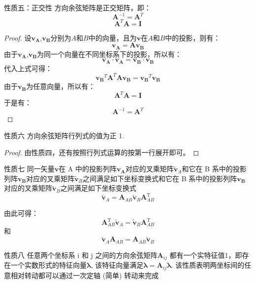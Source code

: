 \begin{myTheorem}{性质五：正交性}
    方向余弦矩阵是正交矩阵，即：
$$\boldsymbol{A}^{-1} = \boldsymbol{A}^{T}$$
        $$\boldsymbol{A}^{T}\boldsymbol{A}=\boldsymbol{I}$$

\end{myTheorem}
\begin{proof}
    设$\mathbf{v_A}$,$\mathbf{v_B}$分别为$A$和$B$中的向量，且为$\mathbf{v}$在$A$和$B$中的投影，则有：
$$\mathbf{v_A}=\boldsymbol{A}\mathbf{v_B}$$
    由于$\mathbf{v_A}$,$\mathbf{v_B}$为同一个向量在不同坐标系下的投影，所以有：
$$\mathbf{v_A}\cdot\mathbf{v_A}=\mathbf{v_B}\cdot\mathbf{v_B}$$
    代入上式可得：
$$\mathbf{v_B}^{T}\boldsymbol{A}^{T}\boldsymbol{A}\mathbf{v_B}=\mathbf{v_B}^{T}\mathbf{v_B}$$
    由于$\mathbf{v_B}$为任意向量，所以有：
$$\boldsymbol{A}^{T}\boldsymbol{A}=\boldsymbol{I}$$
    于是有：
$$\boldsymbol{A}^{-1} = \boldsymbol{A}^{T}$$
\end{proof}

\begin{myTheorem}{性质六}
    方向余弦矩阵行列式的值为正 1.
\end{myTheorem}
\begin{proof}
    由性质四，还有按照行列式运算的按第一行展开即可。
\end{proof}

\begin{myTheorem}{性质七}
    同一矢量$\mathbf{v}$在 A 中的投影列阵$\mathbf{v_A}$对应的叉乘矩阵$\tilde{\mathbf{v}}_A$和它在 B 系中的投影列阵$\mathbf{v_B}$对应的叉乘矩阵$\tilde{\mathbf{v}}_B$之间满足如下坐标变换式和它在 B 系中的投影列阵$\mathbf{v_B}$对应的叉乘矩阵$\tilde{\mathbf{v}}_B$之间满足如下坐标变换式$$\tilde{\mathbf{v}}_A=\mathbf{A}_{AB}\tilde{\mathbf{v}}_B \mathbf{A}_{AB}^\mathrm{T}$$

    由此可得：
    \begin{equation}
        \mathbf{A}_{AB}^\mathrm{T} \tilde{\mathbf{v}}_A=\tilde{\mathbf{v}}_B \mathbf{A}_{AB}^\mathrm{T}
    \end{equation}
    和
    \begin{equation}
        \tilde{\mathbf{v}}_A\mathbf{A}_{AB}=\mathbf{A}_{AB}\tilde{\mathbf{v}}_B
    \end{equation}

\end{myTheorem}


\begin{myTheorem}{性质八}
    任意两个坐标系 i 和 j 之间的方向余弦矩阵$\mathbf{A}_{ij}$ 都有一个实特征值1，即存在一个实数形式的特征向量$\mathbf{\lambda}$, 该特征向量满足$\mathbf{\lambda}=\mathbf{A}_{ij}\mathbf{\lambda}$. 该性质表明两坐标间的任意相对转动都可以通过一次定轴 (简单) 转动来完成
\end{myTheorem}

